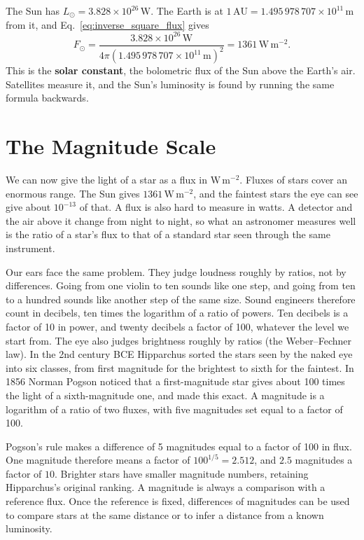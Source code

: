 \begin{example}
	The Sun has $L_\odot = 3.828 \times 10^{26}\,\mathrm{W}$. The Earth is at $1\,\mathrm{AU} = 1.495\,978\,707 \times 10^{11}\,\mathrm{m}$ from it, and Eq.~\eqref{eq:inverse_square_flux} gives
	\[
	F_\odot = \frac{3.828 \times 10^{26}\,\mathrm W}{4\pi \left(1.495\,978\,707 \times 10^{11}\,\mathrm m\right)^2} = 1361\,\mathrm{W\,m^{-2}}.
	\]
	This is the \textbf{solar constant}, the bolometric flux of the Sun above the Earth's air. Satellites measure it, and the Sun's luminosity is found by running the same formula backwards.
\end{example}

\section{The Magnitude Scale}
\label{ph:sec:magnitudes}

We can now give the light of a star as a flux in $\mathrm{W\,m^{-2}}$. Fluxes of stars cover an enormous range. The Sun gives $1361\,\mathrm{W\,m^{-2}}$, and the faintest stars the eye can see give about $10^{-13}$ of that. A flux is also hard to measure in watts. A detector and the air above it change from night to night, so what an astronomer measures well is the ratio of a star's flux to that of a standard star seen through the same instrument.

Our ears face the same problem. They judge loudness roughly by ratios, not by differences. Going from one violin to ten sounds like one step, and going from ten to a hundred sounds like another step of the same size. Sound engineers therefore count in decibels, ten times the logarithm of a ratio of powers. Ten decibels is a factor of 10 in power, and twenty decibels a factor of 100, whatever the level we start from. The eye also judges brightness roughly by ratios (the Weber--Fechner law). In the 2nd century BCE Hipparchus sorted the stars seen by the naked eye into six classes, from first magnitude for the brightest to sixth for the faintest. In 1856 Norman Pogson noticed that a first-magnitude star gives about 100 times the light of a sixth-magnitude one, and made this exact. A magnitude is a logarithm of a ratio of two fluxes, with five magnitudes set equal to a factor of 100.

Pogson's rule makes a difference of 5 magnitudes equal to a factor of 100 in flux. One magnitude therefore means a factor of $100^{1/5}=2.512$, and $2.5$ magnitudes a factor of $10$. Brighter stars have smaller magnitude numbers, retaining Hipparchus's original ranking. A magnitude is always a comparison with a reference flux. Once the reference is fixed, differences of magnitudes can be used to compare stars at the same distance or to infer a distance from a known luminosity.

